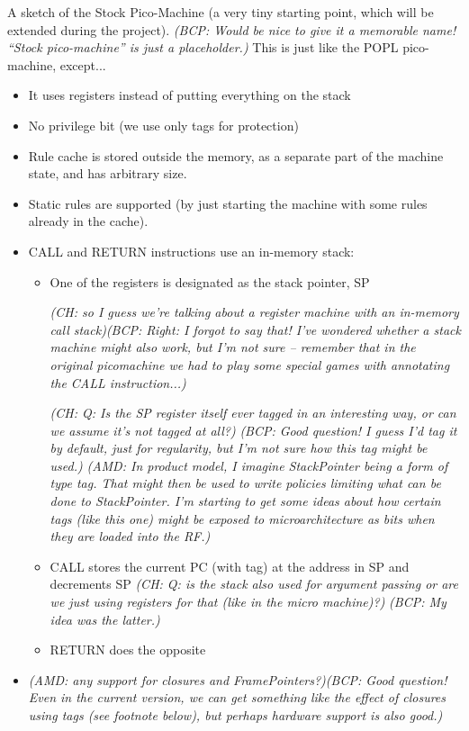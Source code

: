 \documentclass{article}
\newcommand{\bcp}[1]{{\color{blue}\em (BCP: #1)}}
\newcommand{\amd}[1]{{\color{purple}\em (AMD: #1)}}
\newcommand{\ch}[1]{{\color{dkblue}\em (CH: #1)}}
\begin{document}
A sketch of the Stock Pico-Machine (a very tiny starting point, which will
be extended during the project).  \bcp{Would be nice to give it a memorable
  name!  ``Stock pico-machine'' is just a placeholder.}  This is just like
the POPL pico-machine, except...
\begin{itemize}
\item It uses registers instead of putting everything on the stack
\item No privilege bit (we use only tags for protection)
\item Rule cache is stored outside the memory, as a separate part of the
machine state, and has arbitrary size.
\item Static rules are supported (by just starting the machine with some
rules already in the cache).
\item CALL and RETURN instructions use an in-memory stack:
\begin{itemize}
\item One of the registers is designated as the stack pointer, SP

\ch{so I guess we're talking about a register machine with an in-memory call
  stack}\bcp{Right: I forgot to say that!  I've wondered whether a stack
  machine might also work, but I'm not sure -- remember that in the original
  picomachine we had to play some special games with annotating the CALL
  instruction...}

  \ch{Q: Is the SP register itself ever tagged in an interesting
    way, or can we assume it's not tagged at all?}
  \bcp{Good question!  I guess I'd tag it by default, just for regularity,
    but I'm not sure how this tag might be used.}
  \amd{In product model, I imagine StackPointer being a form of type tag.
    That might then be used to write policies limiting what can be done to
    StackPointer.  I'm starting to get some ideas about how certain tags
    (like this one) might be exposed to microarchitecture as bits when they
    are loaded into the RF.}

\item CALL stores the current PC (with tag) at the address in SP and
decrements SP
  \ch{Q: is the stack also used for argument passing or are we
      just using registers for that (like in the micro machine)?} \bcp{My
      idea was the latter.}
\item RETURN does the opposite
\end{itemize}

\item \amd{any support for closures and FramePointers?}\bcp{Good question!
  Even in the current version, we can get something like the effect of
  closures using tags (see footnote below), but perhaps hardware support is
  also good.}


\end{itemize}
\end{document}
